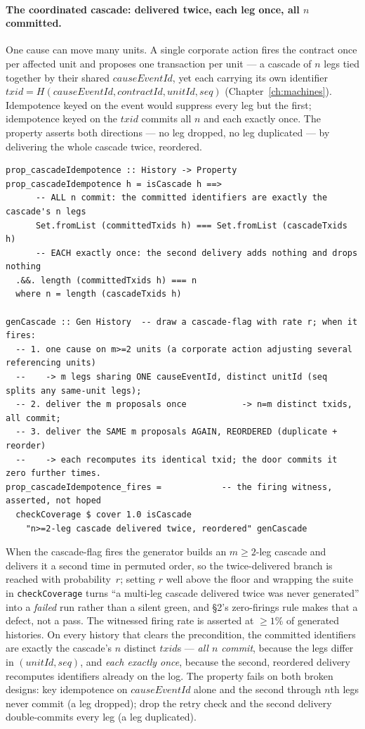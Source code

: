 \paragraph{The coordinated cascade: delivered twice, each leg once, all $n$ committed.}
One cause can move many units. A single corporate action fires the contract once per
affected unit and proposes one transaction per unit --- a cascade of $n$ legs tied
together by their shared $\mathit{causeEventId}$, yet each carrying its own identifier
$\mathit{txid}=H(\mathit{causeEventId},\mathit{contractId},\mathit{unitId},\mathit{seq})$
(Chapter~\ref{ch:machines}). Idempotence keyed on the event would suppress every leg
but the first; idempotence keyed on the $\mathit{txid}$ commits all $n$ and each
exactly once. The property asserts both directions --- no leg dropped, no leg
duplicated --- by delivering the whole cascade twice, reordered.

\begin{lstlisting}
prop_cascadeIdempotence :: History -> Property
prop_cascadeIdempotence h = isCascade h ==>
      -- ALL n commit: the committed identifiers are exactly the cascade's n legs
      Set.fromList (committedTxids h) === Set.fromList (cascadeTxids h)
      -- EACH exactly once: the second delivery adds nothing and drops nothing
  .&&. length (committedTxids h) === n
  where n = length (cascadeTxids h)

genCascade :: Gen History  -- draw a cascade-flag with rate r; when it fires:
  -- 1. one cause on m>=2 units (a corporate action adjusting several referencing units)
  --    -> m legs sharing ONE causeEventId, distinct unitId (seq splits any same-unit legs);
  -- 2. deliver the m proposals once           -> n=m distinct txids, all commit;
  -- 3. deliver the SAME m proposals AGAIN, REORDERED (duplicate + reorder)
  --    -> each recomputes its identical txid; the door commits it zero further times.
prop_cascadeIdempotence_fires =            -- the firing witness, asserted, not hoped
  checkCoverage $ cover 1.0 isCascade
    "n>=2-leg cascade delivered twice, reordered" genCascade
\end{lstlisting}

When the cascade-flag fires the generator builds an $m\ge 2$-leg cascade and delivers
it a second time in permuted order, so the twice-delivered branch is reached with
probability~$r$; setting $r$ well above the floor and wrapping the suite in
\texttt{checkCoverage} turns ``a multi-leg cascade delivered twice was never
generated'' into a \emph{failed} run rather than a silent green, and \S 2's
zero-firings rule makes that a defect, not a pass. The witnessed firing rate is
asserted at $\ge 1\%$ of generated histories. On every history that clears the
precondition, the committed identifiers are exactly the cascade's $n$ distinct
$\mathit{txid}$s --- \emph{all $n$ commit}, because the legs differ in
$(\mathit{unitId},\mathit{seq})$, and \emph{each exactly once}, because the second,
reordered delivery recomputes identifiers already on the log. The property fails on
both broken designs: key idempotence on $\mathit{causeEventId}$ alone and the second
through $n$th legs never commit (a leg dropped); drop the retry check and the second
delivery double-commits every leg (a leg duplicated).

